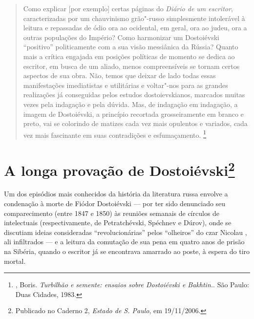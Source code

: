 \begin{quote}
Como explicar [por exemplo] certas páginas do \emph{Diário de um escritor}, caracterizadas por um chauvinismo grão"-russo simplesmente intolerável à leitura e repassadas de ódio ora ao ocidental, em geral, ora ao judeu, ora a outras populações do Império? Como harmonizar um Dostoiévski ``positivo'' politicamente com a sua visão messiânica da Rússia? Quanto mais a crítica engajada em posições políticas de momento se dedica ao escritor, em busca de um aliado, menos compreensíveis se tornam certos aspectos de sua obra. Não, temos que deixar de lado todas essas manifestações imediatistas e utilitárias e voltar"-nos para as grandes realizações já conseguidas pelos estudos dostoievskianos, marcados muitas vezes pela indagação e pela dúvida. Mas, de indagação em indagação, a imagem de Dostoiévski, a princípio recortada grosseiramente em branco e preto, vai se colorindo de matizes cada vez mais opulentos e variados, cada vez mais fascinante em suas contradições e esfumaçamento. \footnote{, Boris. \emph{Turbilhão e semente: ensaios sobre Dostoiévski e Bakhtin.}. São Paulo: Duas Cidades, 1983.}
\end{quote}



\chapter*{A longa provação de Dostoiévski\footnote{Publicado no Caderno 2, \emph{Estado de S. Paulo}, em 19/11/2006.}}



Um dos episódios mais conhecidos da história da literatura russa envolve a
condenação à morte de Fiódor Dostoiévski --- por ter sido
denunciado seu comparecimento (entre 1847 e 1850) às reuniões
semanais de círculos de intelectuais (respectivamente, de
Petratchévski, Spéchnev e Dúrov), onde se discutiam ideias
consideradas ``revolucionárias'' pelos ``olheiros'' do czar
Nicolau , ali infiltrados --- e a leitura da
comutação de sua pena em quatro anos de prisão na Sibéria,
quando o escritor já se encontrava amarrado ao poste,
à espera do tiro mortal.

